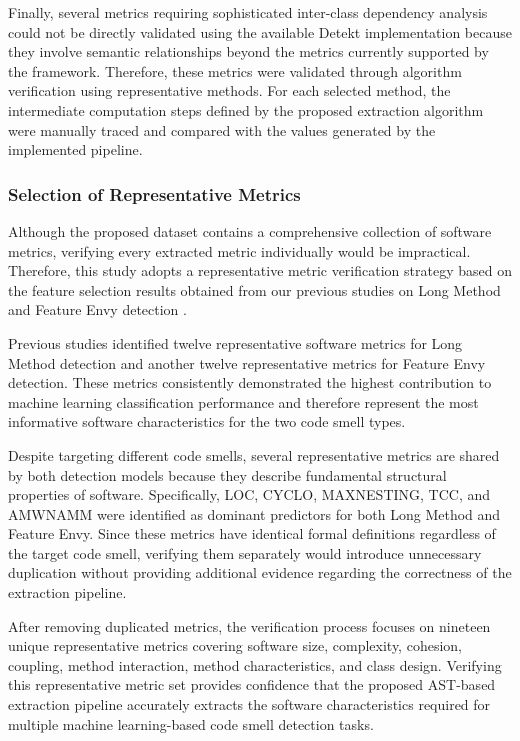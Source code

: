 \documentclass[]{einformatica}
\begin{document}
Finally, several metrics requiring sophisticated inter-class dependency analysis could not be directly validated using the available Detekt implementation because they involve semantic relationships beyond the metrics currently supported by the framework. Therefore, these metrics were validated through algorithm verification using representative methods. For each selected method, the intermediate computation steps defined by the proposed extraction algorithm were manually traced and compared with the values generated by the implemented pipeline.

\subsubsection{Selection of Representative Metrics}

Although the proposed dataset contains a comprehensive collection of software metrics, verifying every extracted metric individually would be impractical. Therefore, this study adopts a representative metric verification strategy based on the feature selection results obtained from our previous studies on Long Method and Feature Envy detection \cite{Wibowo2026}.

Previous studies identified twelve representative software metrics for Long Method detection and another twelve representative metrics for Feature Envy detection. These metrics consistently demonstrated the highest contribution to machine learning classification performance and therefore represent the most informative software characteristics for the two code smell types.

Despite targeting different code smells, several representative metrics are shared by both detection models because they describe fundamental structural properties of software. Specifically, LOC, CYCLO, MAXNESTING, TCC, and AMWNAMM were identified as dominant predictors for both Long Method and Feature Envy. Since these metrics have identical formal definitions regardless of the target code smell, verifying them separately would introduce unnecessary duplication without providing additional evidence regarding the correctness of the extraction pipeline.

After removing duplicated metrics, the verification process focuses on nineteen unique representative metrics covering software size, complexity, cohesion, coupling, method interaction, method characteristics, and class design. Verifying this representative metric set provides confidence that the proposed AST-based extraction pipeline accurately extracts the software characteristics required for multiple machine learning-based code smell detection tasks.
\end{document}
